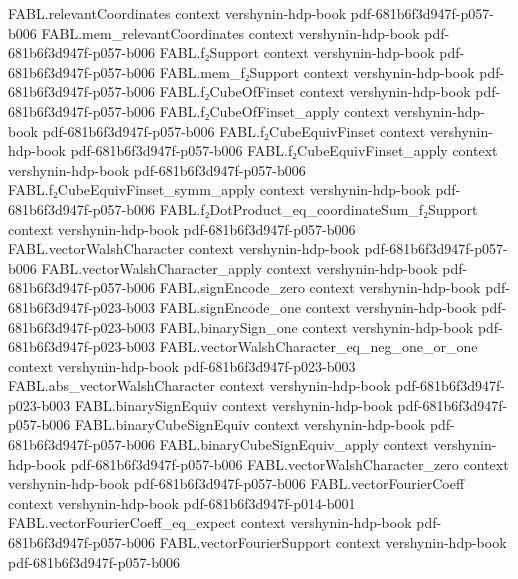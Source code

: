 \begin{theorem}
\proofstep
  {FABL.relevantCoordinates}
  {context}
  {vershynin-hdp-book}
  {pdf-681b6f3d947f-p057-b006}
\proofstep
  {FABL.mem_relevantCoordinates}
  {context}
  {vershynin-hdp-book}
  {pdf-681b6f3d947f-p057-b006}
\proofstep
  {FABL.f₂Support}
  {context}
  {vershynin-hdp-book}
  {pdf-681b6f3d947f-p057-b006}
\proofstep
  {FABL.mem_f₂Support}
  {context}
  {vershynin-hdp-book}
  {pdf-681b6f3d947f-p057-b006}
\proofstep
  {FABL.f₂CubeOfFinset}
  {context}
  {vershynin-hdp-book}
  {pdf-681b6f3d947f-p057-b006}
\proofstep
  {FABL.f₂CubeOfFinset_apply}
  {context}
  {vershynin-hdp-book}
  {pdf-681b6f3d947f-p057-b006}
\proofstep
  {FABL.f₂CubeEquivFinset}
  {context}
  {vershynin-hdp-book}
  {pdf-681b6f3d947f-p057-b006}
\proofstep
  {FABL.f₂CubeEquivFinset_apply}
  {context}
  {vershynin-hdp-book}
  {pdf-681b6f3d947f-p057-b006}
\proofstep
  {FABL.f₂CubeEquivFinset_symm_apply}
  {context}
  {vershynin-hdp-book}
  {pdf-681b6f3d947f-p057-b006}
\proofstep
  {FABL.f₂DotProduct_eq_coordinateSum_f₂Support}
  {context}
  {vershynin-hdp-book}
  {pdf-681b6f3d947f-p057-b006}
\proofstep
  {FABL.vectorWalshCharacter}
  {context}
  {vershynin-hdp-book}
  {pdf-681b6f3d947f-p057-b006}
\proofstep
  {FABL.vectorWalshCharacter_apply}
  {context}
  {vershynin-hdp-book}
  {pdf-681b6f3d947f-p057-b006}
\proofstep
  {FABL.signEncode_zero}
  {context}
  {vershynin-hdp-book}
  {pdf-681b6f3d947f-p023-b003}
\proofstep
  {FABL.signEncode_one}
  {context}
  {vershynin-hdp-book}
  {pdf-681b6f3d947f-p023-b003}
\proofstep
  {FABL.binarySign_one}
  {context}
  {vershynin-hdp-book}
  {pdf-681b6f3d947f-p023-b003}
\proofstep
  {FABL.vectorWalshCharacter_eq_neg_one_or_one}
  {context}
  {vershynin-hdp-book}
  {pdf-681b6f3d947f-p023-b003}
\proofstep
  {FABL.abs_vectorWalshCharacter}
  {context}
  {vershynin-hdp-book}
  {pdf-681b6f3d947f-p023-b003}
\proofstep
  {FABL.binarySignEquiv}
  {context}
  {vershynin-hdp-book}
  {pdf-681b6f3d947f-p057-b006}
\proofstep
  {FABL.binaryCubeSignEquiv}
  {context}
  {vershynin-hdp-book}
  {pdf-681b6f3d947f-p057-b006}
\proofstep
  {FABL.binaryCubeSignEquiv_apply}
  {context}
  {vershynin-hdp-book}
  {pdf-681b6f3d947f-p057-b006}
\proofstep
  {FABL.vectorWalshCharacter_zero}
  {context}
  {vershynin-hdp-book}
  {pdf-681b6f3d947f-p057-b006}
\proofstep
  {FABL.vectorFourierCoeff}
  {context}
  {vershynin-hdp-book}
  {pdf-681b6f3d947f-p014-b001}
\proofstep
  {FABL.vectorFourierCoeff_eq_expect}
  {context}
  {vershynin-hdp-book}
  {pdf-681b6f3d947f-p057-b006}
\proofstep
  {FABL.vectorFourierSupport}
  {context}
  {vershynin-hdp-book}
  {pdf-681b6f3d947f-p057-b006}
\proofstep

\end{theorem}
